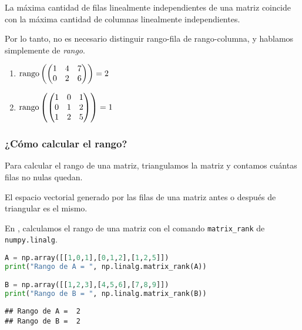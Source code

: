 \begin{proposicion} La máxima cantidad de filas linealmente independientes de una matriz coincide con la máxima cantidad de columnas linealmente independientes.
\end{proposicion}

Por lo tanto, no es necesario distinguir rango-fila de rango-columna, y hablamos simplemente de \emph{rango}.

\begin{ejemplo}\leavevmode
\begin{enumerate}
\item $\operatorname{rango}\left(\begin{pmatrix}1&4&7\\0&2&6\end{pmatrix}\right) = 2$
\item $\operatorname{rango}\left(\begin{pmatrix}1&0&1 \\ 0&1&2 \\ 1 & 2 & 5\end{pmatrix}\right) = 1$
\end{enumerate}
\end{ejemplo}

\subsubsection{¿Cómo calcular el rango?}

Para calcular el rango de una matriz, triangulamos la matriz y contamos cuántas filas no nulas quedan.

\begin{proposicion}
El espacio vectorial generado por las filas de una matriz antes o después de triangular es el mismo.
\end{proposicion}

En \python, calculamos el rango de una matriz con el comando \texttt{matrix\_rank} de \texttt{numpy.linalg}.

\begin{Shaded}
\begin{lstlisting}[language=Python]
A = np.array([[1,0,1],[0,1,2],[1,2,5]])
print("Rango de A = ", np.linalg.matrix_rank(A))

B = np.array([[1,2,3],[4,5,6],[7,8,9]])
print("Rango de B = ", np.linalg.matrix_rank(B))
\end{lstlisting}
\end{Shaded}

\begin{verbatim}
## Rango de A =  2
## Rango de B =  2
\end{verbatim}

